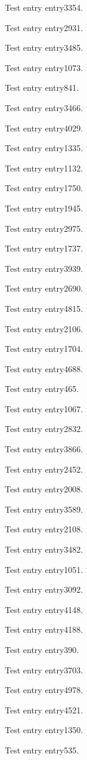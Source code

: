 Test entry \gls{entry3354}.

Test entry \gls{entry2931}.

Test entry \gls{entry3485}.

Test entry \gls{entry1073}.

Test entry \gls{entry841}.

Test entry \gls{entry3466}.

Test entry \gls{entry4029}.

Test entry \gls{entry1335}.

Test entry \gls{entry1132}.

Test entry \gls{entry1750}.

Test entry \gls{entry1945}.

Test entry \gls{entry2975}.

Test entry \gls{entry1737}.

Test entry \gls{entry3939}.

Test entry \gls{entry2690}.

Test entry \gls{entry4815}.

Test entry \gls{entry2106}.

Test entry \gls{entry1704}.

Test entry \gls{entry4688}.

Test entry \gls{entry465}.

Test entry \gls{entry1067}.

Test entry \gls{entry2832}.

Test entry \gls{entry3866}.

Test entry \gls{entry2452}.

Test entry \gls{entry2008}.

Test entry \gls{entry3589}.

Test entry \gls{entry2108}.

Test entry \gls{entry3482}.

Test entry \gls{entry1051}.

Test entry \gls{entry3092}.

Test entry \gls{entry4148}.

Test entry \gls{entry4188}.

Test entry \gls{entry390}.

Test entry \gls{entry3703}.

Test entry \gls{entry4978}.

Test entry \gls{entry4521}.

Test entry \gls{entry1350}.

Test entry \gls{entry535}.

